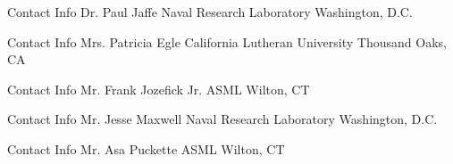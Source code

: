 

\begin{cventries}

  \cventry
    {Contact Info} %
    {Dr. Paul Jaffe} %
    {Naval Research Laboratory} %
    {Washington, D.C.} %
	{}
	
	\cventry
    {Contact Info} %
    {Mrs. Patricia Egle} %
    {California Lutheran University} %
    {Thousand Oaks, CA} %
	{}
	
	\cventry
    {Contact Info} %
    {Mr. Frank Jozefick Jr.} %
    {ASML} %
    {Wilton, CT} %
	{}
	
	\cventry
    {Contact Info} %
    {Mr. Jesse Maxwell} %
    {Naval Research Laboratory} %
    {Washington, D.C.} %
	{}
	
	\cventry
    {Contact Info} %
    {Mr. Asa Puckette} %
    {ASML} %
    {Wilton, CT} %
	{}
\end{cventries}
